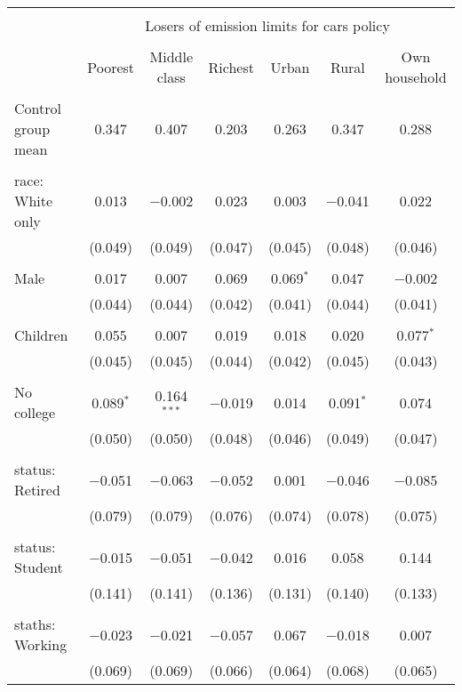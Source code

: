 
\begin{tabular}{@{\extracolsep{5pt}}lcccccc} 
\\[-1.8ex]\hline 
\hline \\[-1.8ex] 
 & \multicolumn{6}{c}{Losers of emission limits for cars policy} \\ 
\cline{2-7} 
\\[-1.8ex] & Poorest & Middle class & Richest & Urban & Rural & Own household \\ 
\hline \\[-1.8ex] 
 Control group mean & 0.347 & 0.407 & 0.203 & 0.263 & 0.347 & 0.288  \\ \hline \\[-1.8ex] race: White only & 0.013 & $-$0.002 & 0.023 & 0.003 & $-$0.041 & 0.022 \\ 
  & (0.049) & (0.049) & (0.047) & (0.045) & (0.048) & (0.046) \\ 
  & & & & & & \\ 
 Male & 0.017 & 0.007 & 0.069 & 0.069$^{*}$ & 0.047 & $-$0.002 \\ 
  & (0.044) & (0.044) & (0.042) & (0.041) & (0.044) & (0.041) \\ 
  & & & & & & \\ 
 Children & 0.055 & 0.007 & 0.019 & 0.018 & 0.020 & 0.077$^{*}$ \\ 
  & (0.045) & (0.045) & (0.044) & (0.042) & (0.045) & (0.043) \\ 
  & & & & & & \\ 
 No college & 0.089$^{*}$ & 0.164$^{***}$ & $-$0.019 & 0.014 & 0.091$^{*}$ & 0.074 \\ 
  & (0.050) & (0.050) & (0.048) & (0.046) & (0.049) & (0.047) \\ 
  & & & & & & \\ 
 status: Retired & $-$0.051 & $-$0.063 & $-$0.052 & 0.001 & $-$0.046 & $-$0.085 \\ 
  & (0.079) & (0.079) & (0.076) & (0.074) & (0.078) & (0.075) \\ 
  & & & & & & \\ 
 status: Student & $-$0.015 & $-$0.051 & $-$0.042 & 0.016 & 0.058 & 0.144 \\ 
  & (0.141) & (0.141) & (0.136) & (0.131) & (0.140) & (0.133) \\ 
  & & & & & & \\ 
 staths: Working & $-$0.023 & $-$0.021 & $-$0.057 & 0.067 & $-$0.018 & 0.007 \\ 
  & (0.069) & (0.069) & (0.066) & (0.064) & (0.068) & (0.065) \\ 

\end{tabular}

